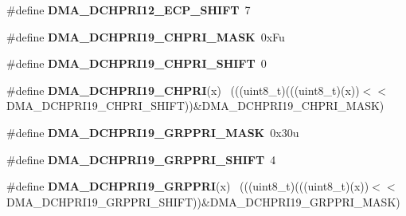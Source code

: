 \begin{DoxyCompactItemize}
\item 
\hypertarget{group___d_m_a___register___masks_ga5331565714ddd597bad4518d1c5317e4}{}\#define {\bfseries D\+M\+A\+\_\+\+D\+C\+H\+P\+R\+I12\+\_\+\+E\+C\+P\+\_\+\+S\+H\+I\+F\+T}~7\label{group___d_m_a___register___masks_ga5331565714ddd597bad4518d1c5317e4}

\item 
\hypertarget{group___d_m_a___register___masks_gaed8ef209a0eaf08ab66d6edfc0a602a7}{}\#define {\bfseries D\+M\+A\+\_\+\+D\+C\+H\+P\+R\+I19\+\_\+\+C\+H\+P\+R\+I\+\_\+\+M\+A\+S\+K}~0x\+Fu\label{group___d_m_a___register___masks_gaed8ef209a0eaf08ab66d6edfc0a602a7}

\item 
\hypertarget{group___d_m_a___register___masks_gafd7e214d6e9b176c371e5009a4c294b6}{}\#define {\bfseries D\+M\+A\+\_\+\+D\+C\+H\+P\+R\+I19\+\_\+\+C\+H\+P\+R\+I\+\_\+\+S\+H\+I\+F\+T}~0\label{group___d_m_a___register___masks_gafd7e214d6e9b176c371e5009a4c294b6}

\item 
\hypertarget{group___d_m_a___register___masks_ga994544c27da1541c2dd348ccd27979f1}{}\#define {\bfseries D\+M\+A\+\_\+\+D\+C\+H\+P\+R\+I19\+\_\+\+C\+H\+P\+R\+I}(x)                                    ~(((uint8\+\_\+t)(((uint8\+\_\+t)(x))$<$$<$D\+M\+A\+\_\+\+D\+C\+H\+P\+R\+I19\+\_\+\+C\+H\+P\+R\+I\+\_\+\+S\+H\+I\+F\+T))\&D\+M\+A\+\_\+\+D\+C\+H\+P\+R\+I19\+\_\+\+C\+H\+P\+R\+I\+\_\+\+M\+A\+S\+K)\label{group___d_m_a___register___masks_ga994544c27da1541c2dd348ccd27979f1}

\item 
\hypertarget{group___d_m_a___register___masks_gac3c3e7d296b45bf899a2dae8c9ef0a84}{}\#define {\bfseries D\+M\+A\+\_\+\+D\+C\+H\+P\+R\+I19\+\_\+\+G\+R\+P\+P\+R\+I\+\_\+\+M\+A\+S\+K}~0x30u\label{group___d_m_a___register___masks_gac3c3e7d296b45bf899a2dae8c9ef0a84}

\item 
\hypertarget{group___d_m_a___register___masks_ga7775ae055500c9d187517086430fee09}{}\#define {\bfseries D\+M\+A\+\_\+\+D\+C\+H\+P\+R\+I19\+\_\+\+G\+R\+P\+P\+R\+I\+\_\+\+S\+H\+I\+F\+T}~4\label{group___d_m_a___register___masks_ga7775ae055500c9d187517086430fee09}

\item 
\hypertarget{group___d_m_a___register___masks_ga34c23be74d9530fee8461e1ce22d5326}{}\#define {\bfseries D\+M\+A\+\_\+\+D\+C\+H\+P\+R\+I19\+\_\+\+G\+R\+P\+P\+R\+I}(x)                                  ~(((uint8\+\_\+t)(((uint8\+\_\+t)(x))$<$$<$D\+M\+A\+\_\+\+D\+C\+H\+P\+R\+I19\+\_\+\+G\+R\+P\+P\+R\+I\+\_\+\+S\+H\+I\+F\+T))\&D\+M\+A\+\_\+\+D\+C\+H\+P\+R\+I19\+\_\+\+G\+R\+P\+P\+R\+I\+\_\+\+M\+A\+S\+K)\label{group___d_m_a___register___masks_ga34c23be74d9530fee8461e1ce22d5326}


\end{DoxyCompactItemize}
